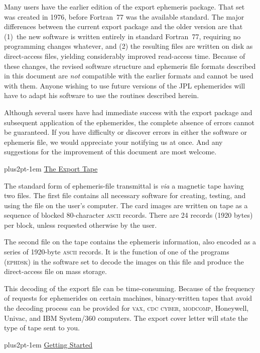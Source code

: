 \documentclass[twoside,11pt]{article}
\renewcommand{\_}{\texttt{\symbol{95}}}
\newcommand{\hdg}[1]{\vskip4pt plus2pt\leavevmode\kern-1em \underline{\large{#1}}\par}
\newcommand{\hdg}[1]{\subsection*{{#1}}}
\begin{document}
Many users have the earlier edition of the export ephemeris
package. That set was created in 1976, before Fortran~77 was
the available standard.
The major differences between the current export package and
the older version are that (1)~the new software is
written entirely in standard Fortran~77, requiring no programming changes
whatever, and (2) the resulting files are written on disk as
direct-access files, yielding considerably improved read-access time.
Because of these changes,
the revised software structure and ephemeris
file formats described in this document are {\it not\/} compatible
with the earlier formats and cannot be used with them.
Anyone wishing to use future versions of the JPL ephemerides
will have to adapt his software to use the routines described
herein.
 
Although several users have had immediate success with the export
package and subsequent application of the ephemerides, the complete
absence of errors cannot be guaranteed. If you have difficulty
or discover errors in either the software or ephemeris file,
we would appreciate your notifying us at once. And any suggestions
for the improvement of this document are most welcome.
 
\hdg{The Export Tape}

The standard form of ephemeris-file transmittal is {\sl via\/}
a magnetic tape having two files. The first file contains
all necessary software for creating, testing, and using the file
on the user's computer. The card images are written on tape as a sequence
of blocked 80-character \textsc{ascii} records. There are 24 records
(1920 bytes)
per block, unless requested otherwise by the user.
 
The second file on the tape contains the ephemeris information,
also encoded as a series of 1920-byte \textsc{ascii} records.
It is the function of one of the programs (\textsc{ephdsk}) in the software
set to decode the images on this file and produce the direct-access
file on mass storage.
 
This decoding of the export file can be
time-consuming. Because of the frequency of requests for ephemerides
on certain machines, binary-written tapes that avoid the
decoding process can be provided for \textsc{vax, cdc cyber, modcomp},
Honeywell, Univac, and IBM System/360 computers.
The export cover letter will state the type of tape sent to you.


\hdg{Getting Started}
\end{document}
